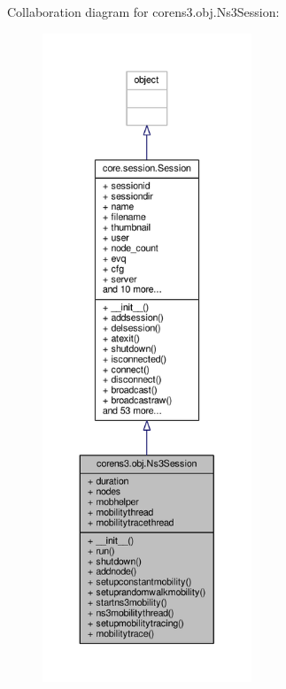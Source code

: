 Collaboration diagram for corens3.\+obj.\+Ns3\+Session\+:
\nopagebreak
\begin{figure}[H]
\begin{center}
\leavevmode
\includegraphics[height=550pt]{classcorens3_1_1obj_1_1_ns3_session__coll__graph}
\end{center}
\end{figure}
